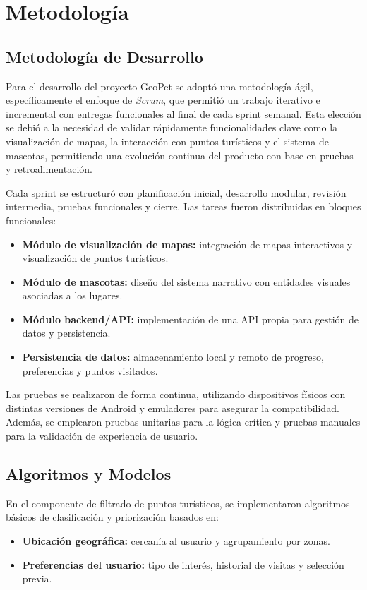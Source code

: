 \documentclass[12pt]{article}
\begin{document}
\section{Metodología}

\subsection*{Metodología de Desarrollo}

Para el desarrollo del proyecto GeoPet se adoptó una metodología ágil, específicamente el enfoque de \textit{Scrum}, que permitió un trabajo iterativo e incremental con entregas funcionales al final de cada sprint semanal. Esta elección se debió a la necesidad de validar rápidamente funcionalidades clave como la visualización de mapas, la interacción con puntos turísticos y el sistema de mascotas, permitiendo una evolución continua del producto con base en pruebas y retroalimentación.

Cada sprint se estructuró con planificación inicial, desarrollo modular, revisión intermedia, pruebas funcionales y cierre. Las tareas fueron distribuidas en bloques funcionales:
\begin{itemize}
    \item \textbf{Módulo de visualización de mapas:} integración de mapas interactivos y visualización de puntos turísticos.
    \item \textbf{Módulo de mascotas:} diseño del sistema narrativo con entidades visuales asociadas a los lugares.
    \item \textbf{Módulo backend/API:} implementación de una API propia para gestión de datos y persistencia.
    \item \textbf{Persistencia de datos:} almacenamiento local y remoto de progreso, preferencias y puntos visitados.
\end{itemize}

Las pruebas se realizaron de forma continua, utilizando dispositivos físicos con distintas versiones de Android y emuladores para asegurar la compatibilidad. Además, se emplearon pruebas unitarias para la lógica crítica y pruebas manuales para la validación de experiencia de usuario.

\subsection*{Algoritmos y Modelos}

En el componente de filtrado de puntos turísticos, se implementaron algoritmos básicos de clasificación y priorización basados en:
\begin{itemize}
    \item \textbf{Ubicación geográfica:} cercanía al usuario y agrupamiento por zonas.
    \item \textbf{Preferencias del usuario:} tipo de interés, historial de visitas y selección previa.
\end{itemize}
\end{document}
